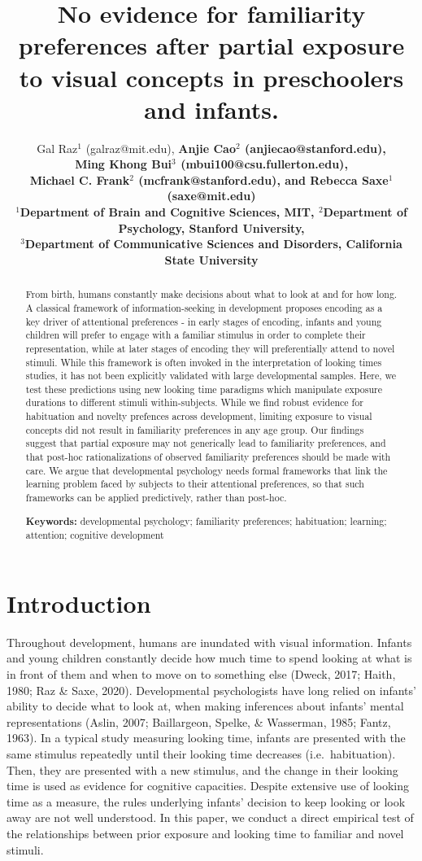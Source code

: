 \documentclass[10pt, letterpaper]{article}
\title{No evidence for familiarity preferences after partial exposure to
visual concepts in preschoolers and infants.}
\author{Gal Raz$^1$ (galraz@mit.edu), \bf{Anjie Cao$^2$  (anjiecao@stanford.edu)},\\ \bf{Ming Khong Bui$^3$  (mbui100@csu.fullerton.edu)}, \\ \bf{Michael C. Frank$^2$ (mcfrank@stanford.edu)},
 and \bf{Rebecca Saxe$^1$ (saxe@mit.edu)} \\
$^1$Department of Brain and Cognitive Sciences, MIT, $^2$Department of Psychology, Stanford University, \\ $^3$Department of Communicative Sciences and Disorders, California State University \\
}
\begin{document}
\maketitle

\begin{abstract}
From birth, humans constantly make decisions about what to look at and
for how long. A classical framework of information-seeking in
development proposes encoding as a key driver of attentional preferences
- in early stages of encoding, infants and young children will prefer to
engage with a familiar stimulus in order to complete their
representation, while at later stages of encoding they will
preferentially attend to novel stimuli. While this framework is often
invoked in the interpretation of looking times studies, it has not been
explicitly validated with large developmental samples. Here, we test
these predictions using new looking time paradigms which manipulate
exposure durations to different stimuli within-subjects. While we find
robust evidence for habituation and novelty prefences across
development, limiting exposure to visual concepts did not result in
familiarity preferences in any age group. Our findings suggest that
partial exposure may not generically lead to familiarity preferences,
and that post-hoc rationalizations of observed familiarity preferences
should be made with care. We argue that developmental psychology needs
formal frameworks that link the learning problem faced by subjects to
their attentional preferences, so that such frameworks can be applied
predictively, rather than post-hoc.

\textbf{Keywords:}
developmental psychology; familiarity preferences; habituation;
learning; attention; cognitive development
\end{abstract}

\hypertarget{introduction}{%
\section{Introduction}\label{introduction}}

Throughout development, humans are inundated with visual information.
Infants and young children constantly decide how much time to spend
looking at what is in front of them and when to move on to something
else (Dweck, 2017; Haith, 1980; Raz \& Saxe, 2020). Developmental
psychologists have long relied on infants' ability to decide what to
look at, when making inferences about infants' mental representations
(Aslin, 2007; Baillargeon, Spelke, \& Wasserman, 1985; Fantz, 1963). In
a typical study measuring looking time, infants are presented with the
same stimulus repeatedly until their looking time decreases
(i.e.~habituation). Then, they are presented with a new stimulus, and
the change in their looking time is used as evidence for cognitive
capacities. Despite extensive use of looking time as a measure, the
rules underlying infants' decision to keep looking or look away are not
well understood. In this paper, we conduct a direct empirical test of
the relationships between prior exposure and looking time to familiar
and novel stimuli.
\end{document}
